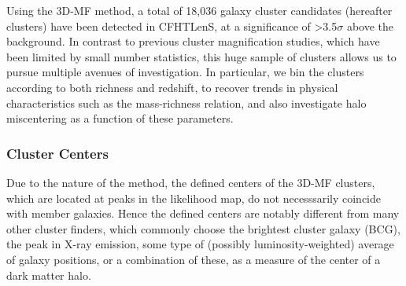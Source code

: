 Using the 3D-MF method, a total of 18,036 galaxy cluster candidates (hereafter clusters) have been detected in CFHTLenS, at a significance of \textgreater 3.5$\sigma$ above the background. In contrast to previous cluster magnification studies, which have been limited by small number statistics, this huge sample of clusters allows us to pursue multiple avenues of investigation. In particular, we bin the clusters according to both richness and redshift, to recover trends in physical characteristics such as the mass-richness relation, and also investigate halo miscentering as a function of these parameters.

\subsubsection{Cluster Centers}
\label{centering}
Due to the nature of the method, the defined centers of the 3D-MF clusters, which are located at peaks in the likelihood map, do not necesssarily coincide with member galaxies. Hence the defined centers are notably different from many other cluster finders, which commonly choose the brightest cluster galaxy (BCG), the peak in X-ray emission, some type of (possibly luminosity-weighted) average of galaxy positions, or a combination of these, as a measure of the center of a dark matter halo.

